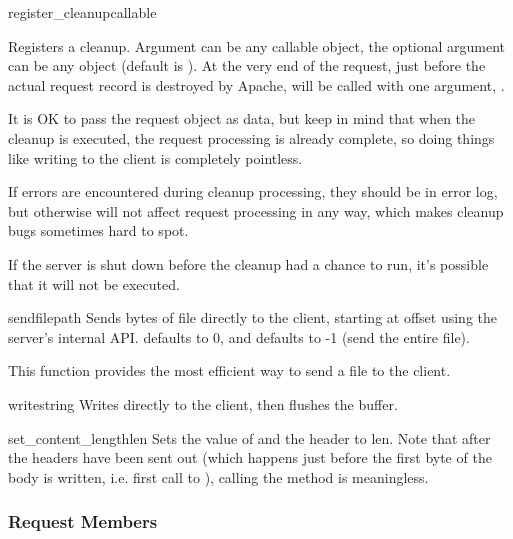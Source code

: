 \begin{methoddesc}[request]{register_cleanup}{callable}

  Registers a cleanup. Argument  can be any callable
  object, the optional argument  can be any object (default is
  ). At the very end of the request, just before the actual
  request record is destroyed by Apache,  will be called
  with one argument, .

  It is OK to pass the request object as data, but keep in mind that
  when the cleanup is executed, the request processing is already
  complete, so doing things like writing to the client is completely
  pointless. 

  If errors are encountered during cleanup processing, they should be in
  error log, but otherwise will not affect request processing in any
  way, which makes cleanup bugs sometimes hard to spot.

  If the server is shut down before the cleanup had a chance to run,
  it's possible that it will not be executed.

\end{methoddesc}

\begin{methoddesc}[request]{sendfile}{path}
  Sends  bytes of file  directly to the client,
  starting at offset  using the server's internal
  API.  defaults to 0, and  defaults to -1 (send
  the entire file). 

  This function provides the most efficient way to send a file to the
  client.
\end{methoddesc}

\begin{methoddesc}[request]{write}{string}
  Writes  directly to the client, then flushes the buffer. 
\end{methoddesc}

\begin{methoddesc}[request]{set_content_length}{len}
  Sets the value of  and the 
  header to len. Note that after the headers have been sent out (which
  happens just before the first byte of the body is written,
  i.e. first call to ), calling the method is
  meaningless.
\end{methoddesc}

\subsubsection{Request Members\label{pyapi-mprequest-mem}}


